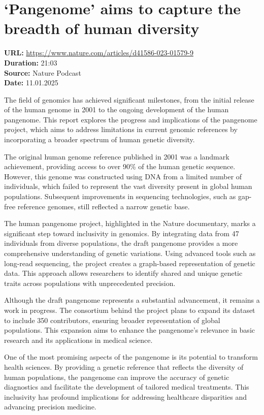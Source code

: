 \documentclass[12pt]{article}
\begin{document}
\section{‘Pangenome’ aims to capture the breadth of human diversity}
\textbf{URL:} \url{https://www.nature.com/articles/d41586-023-01579-9}\\
\textbf{Duration:} 21:03\\
\textbf{Source:} Nature Podcast\\
\textbf{Date:} 11.01.2025



The field of genomics has achieved significant milestones, from the initial release of the human genome in 2001 to the ongoing development of the human pangenome. This report explores the progress and implications of the pangenome project, which aims to address limitations in current genomic references by incorporating a broader spectrum of human genetic diversity.


The original human genome reference published in 2001 was a landmark achievement, providing access to over 90\% of the human genetic sequence. However, this genome was constructed using DNA from a limited number of individuals, which failed to represent the vast diversity present in global human populations. Subsequent improvements in sequencing technologies, such as gap-free reference genomes, still reflected a narrow genetic base.


The human pangenome project, highlighted in the Nature documentary, marks a significant step toward inclusivity in genomics. By integrating data from 47 individuals from diverse populations, the draft pangenome provides a more comprehensive understanding of genetic variations. Using advanced tools such as long-read sequencing, the project creates a graph-based representation of genetic data. This approach allows researchers to identify shared and unique genetic traits across populations with unprecedented precision.

Although the draft pangenome represents a substantial advancement, it remains a work in progress. The consortium behind the project plans to expand its dataset to include 350 contributors, ensuring broader representation of global populations. This expansion aims to enhance the pangenome's relevance in basic research and its applications in medical science.

One of the most promising aspects of the pangenome is its potential to transform health sciences. By providing a genetic reference that reflects the diversity of human populations, the pangenome can improve the accuracy of genetic diagnostics and facilitate the development of tailored medical treatments. This inclusivity has profound implications for addressing healthcare disparities and advancing precision medicine.
\end{document}
